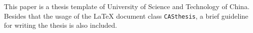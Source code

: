 ﻿
\begin{abstract}
本文是中国科学技术大学学位论文的~\LaTeX{}~模板。除了介绍~\LaTeX{}~文档类
~\texttt{CASthesis}~的用法外，本文还是一个简要的学位论文写作指南。

\end{abstract}


\begin{eabstract}

This paper is a thesis template of University of Science and Technology of China. Besides that
the usage of the \LaTeX{} document class \texttt{CASthesis}, a brief
guideline for writing the thesis is also included.


\end{eabstract}
